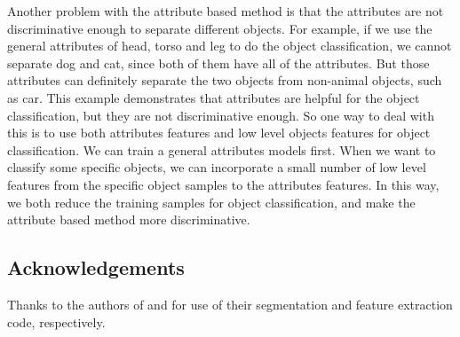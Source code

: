 \documentclass[10pt,twocolumn,letterpaper]{article}
\begin{document}
Another problem with the attribute based method is that the attributes are not discriminative 
enough to separate different objects. For example, if we use the general attributes of head, torso and leg to 
do the object classification, we cannot separate dog and cat, since both of them have all of the attributes. 
But those attributes can definitely separate the two objects from non-animal objects, such as car. This example demonstrates that 
attributes are helpful for the object classification, but they are not discriminative enough. So one way to deal with this is to use 
both attributes features and low level objects features for object classification. We can train a general attributes models first. 
When we want to classify some specific objects, we can incorporate a small number of low level features from the specific object samples to the attributes 
features. In this way, we both reduce the training samples for object classification, and make the attribute based method more discriminative.



\subsection*{Acknowledgements}
Thanks to the authors of \cite{arbelaez09} and \cite{farhadi09} for use of their
segmentation and feature extraction code, respectively.

{\small
%


}
\end{document}

